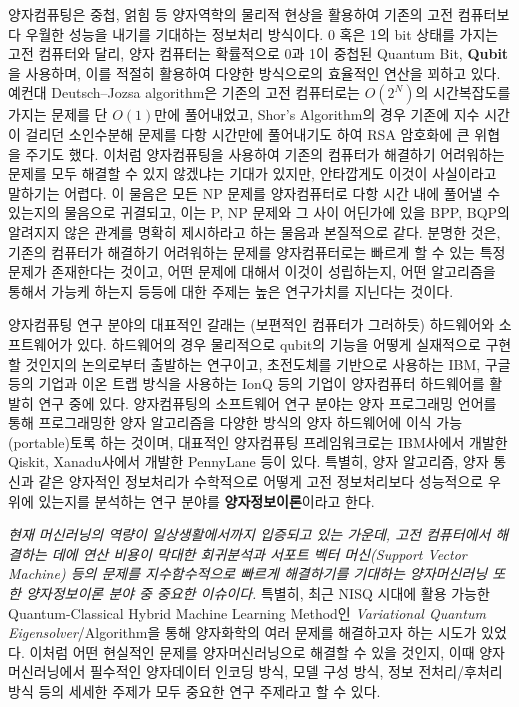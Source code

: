 \quad 양자컴퓨팅은 중첩, 얽힘 등 양자역학의 물리적 현상을 활용하여 기존의 고전 컴퓨터보다 우월한 성능을 내기를 기대하는 정보처리 방식이다. 0 혹은 1의 bit 상태를 가지는 고전 컴퓨터와 달리, 양자 컴퓨터는 확률적으로 0과 1이 중첩된 Quantum Bit, \textbf{Qubit}을 사용하며, 이를 적절히 활용하여 다양한 방식으로의 효율적인 연산을 꾀하고 있다. 예컨대 Deutsch–Jozsa algorithm은 기존의 고전 컴퓨터로는 \( O(2^N) \)의 시간복잡도를 가지는 문제를 단 \( O(1) \)만에 풀어내었고, Shor's Algorithm의 경우 기존에 지수 시간이 걸리던 소인수분해 문제를 다항 시간만에 풀어내기도 하여 RSA 암호화에 큰 위협을 주기도 했다. 이처럼 양자컴퓨팅을 사용하여 기존의 컴퓨터가 해결하기 어려워하는 문제를 모두 해결할 수 있지 않겠냐는 기대가 있지만, 안타깝게도 이것이 사실이라고 말하기는 어렵다. 이 물음은 모든 NP 문제를 양자컴퓨터로 다항 시간 내에 풀어낼 수 있는지의 물음으로 귀결되고, 이는 P, NP 문제와 그 사이 어딘가에 있을 BPP, BQP의 알려지지 않은 관계를 명확히 제시하라고 하는 물음과 본질적으로 같다. 분명한 것은, 기존의 컴퓨터가 해결하기 어려워하는 문제를 양자컴퓨터로는 빠르게 할 수 있는 특정 문제가 존재한다는 것이고, 어떤 문제에 대해서 이것이 성립하는지, 어떤 알고리즘을 통해서 가능케 하는지 등등에 대한 주제는 높은 연구가치를 지닌다는 것이다.

양자컴퓨팅 연구 분야의 대표적인 갈래는 (보편적인 컴퓨터가 그러하듯) 하드웨어와 소프트웨어가 있다. 하드웨어의 경우 물리적으로 qubit의 기능을 어떻게 실재적으로 구현할 것인지의 논의로부터 출발하는 연구이고, 초전도체를 기반으로 사용하는 IBM, 구글 등의 기업과 이온 트랩 방식을 사용하는 IonQ 등의 기업이 양자컴퓨터 하드웨어를 활발히 연구 중에 있다. 양자컴퓨팅의 소프트웨어 연구 분야는 양자 프로그래밍 언어를 통해 프로그래밍한 양자 알고리즘을 다양한 방식의 양자 하드웨어에 이식 가능(portable)토록 하는 것이며, 대표적인 양자컴퓨팅 프레임워크로는 IBM사에서 개발한 Qiskit, Xanadu사에서 개발한 PennyLane 등이 있다. 특별히, 양자 알고리즘, 양자 통신과 같은 양자적인 정보처리가 수학적으로 어떻게 고전 정보처리보다 성능적으로 우위에 있는지를 분석하는 연구 분야를 \textbf{양자정보이론}이라고 한다.

\textit{현재 머신러닝의 역량이 일상생활에서까지 입증되고 있는 가운데, 고전 컴퓨터에서 해결하는 데에 연산 비용이 막대한 회귀분석과 서포트 벡터 머신(Support Vector Machine) 등의 문제를 지수함수적으로 빠르게 해결하기를 기대하는 양자머신러닝 또한 양자정보이론 분야 중 중요한 이슈이다. } 특별히, 최근 NISQ 시대에 활용 가능한 Quantum-Classical Hybrid Machine Learning Method인 \textit{Variational Quantum Eigensolver}/Algorithm을 통해 양자화학의 여러 문제를 해결하고자 하는 시도가 있었다. 이처럼 어떤 현실적인 문제를 양자머신러닝으로 해결할 수 있을 것인지, 이때 양자머신러닝에서 필수적인 양자데이터 인코딩 방식, 모델 구성 방식, 정보 전처리/후처리 방식 등의 세세한 주제가 모두 중요한 연구 주제라고 할 수 있다.


